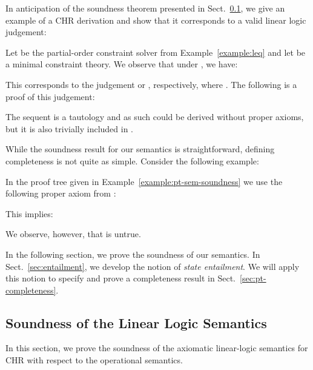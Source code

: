 \documentclass[acmtocl]{acmtrans2m}
\begin{document}
In anticipation of the soundness theorem presented in
Sect.~\ref{sec:pt-soundness}, we give an example of a CHR derivation and show
that it corresponds to a valid linear logic judgement:

\begin{example}
	\label{example:pt-sem-soundness}
Let  be the partial-order constraint solver from
Example~\ref{example:leq} and let  be a minimal constraint theory. We
observe that under , we have:

This corresponds to the judgement
 or
, respectively, where
. The following is a proof of this judgement:

The sequent  is a tautology and as
such could be derived without proper axioms, but it is also trivially included in
.
\end{example}

While the soundness result for our semantics is straightforward, defining
completeness is not quite as simple. Consider the following example:

\begin{example}
	\label{example:pt-sem-completeness-problem}
In the proof tree given in Example~\ref{example:pt-sem-soundness} we use the
following proper axiom from :

This implies:

We observe, however, that
 is untrue.
\end{example}

In the following section, we prove the soundness of our semantics. In
Sect.~\ref{sec:entailment}, we develop the notion of \emph{state entailment}. We
will apply this notion to specify and prove a completeness result in
Sect.~\ref{sec:pt-completeness}.

\subsection{Soundness of the Linear Logic Semantics}
\label{sec:pt-soundness}

In this section, we prove the soundness of the axiomatic linear-logic
semantics for CHR with respect to the operational semantics.
\end{document}
